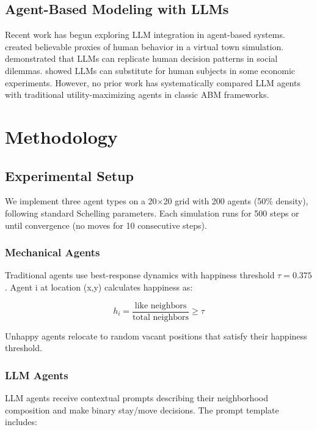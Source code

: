 \documentclass[pdflatex,sn-basic]{sn-jnl}%
\theoremstyle{thmstyleone}%
\theoremstyle{thmstyletwo}%
\theoremstyle{thmstylethree}%
\begin{document}
\subsection{Agent-Based Modeling with LLMs}

Recent work has begun exploring LLM integration in agent-based systems. \cite{Park2023} created believable proxies of human behavior in a virtual town simulation. \cite{Argyle2023} demonstrated that LLMs can replicate human decision patterns in social dilemmas. \cite{Horton2023} showed LLMs can substitute for human subjects in some economic experiments. However, no prior work has systematically compared LLM agents with traditional utility-maximizing agents in classic ABM frameworks.

\section{Methodology}\label{sec:methodology}

\subsection{Experimental Setup}

We implement three agent types on a 20×20 grid with 200 agents (50\% density), following standard Schelling parameters. Each simulation runs for 500 steps or until convergence (no moves for 10 consecutive steps).

\subsubsection{Mechanical Agents}

Traditional agents use best-response dynamics with happiness threshold $\tau = 0.375$. Agent i at location (x,y) calculates happiness as:

\begin{equation}
h_i = \frac{\text{like neighbors}}{\text{total neighbors}} \geq \tau
\end{equation}

Unhappy agents relocate to random vacant positions that satisfy their happiness threshold.

\subsubsection{LLM Agents}

LLM agents receive contextual prompts describing their neighborhood composition and make binary stay/move decisions. The prompt template includes:
\end{document}
